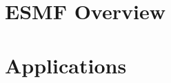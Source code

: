 \documentclass[english]{article}
\begin{document}
\sloppy
{}

\newpage

\newpage
\tableofcontents
\setlength{\parskip}{1.5ex}
\newpage
\begin{htmlonly}
\end{htmlonly}
\part{ESMF Overview}
\label{part:ESMFOverview}
\newpage




\newpage



\newpage
\begin{htmlonly}
\end{htmlonly}
\part{Applications}
\label{part:Applications}

%




\newpage
\begin{htmlonly}
\end{htmlonly}
\end{document}

